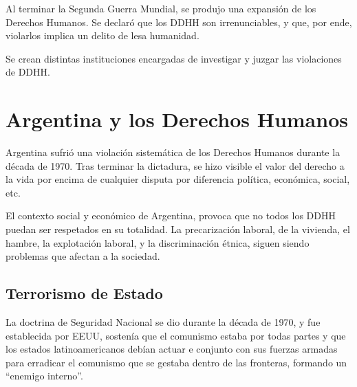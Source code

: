 \documentclass[a4paper, 12pt]{article}
\begin{document}
Al terminar la Segunda Guerra Mundial, se produjo una expansión de los Derechos
Humanos. Se declaró que los DDHH son irrenunciables, y que, por ende, violarlos
implica un delito de lesa humanidad.

Se crean distintas instituciones encargadas de investigar y juzgar las
violaciones de DDHH.

\section{Argentina y los Derechos Humanos}

Argentina sufrió una violación sistemática de los Derechos Humanos durante la
década de 1970. Tras terminar la dictadura, se hizo visible el valor del
derecho a la vida por encima de cualquier disputa por diferencia política,
económica, social, etc.

El contexto social y económico de Argentina, provoca que no todos los DDHH
puedan ser respetados en su totalidad. La precarización laboral, de la
vivienda, el hambre, la explotación laboral, y la discriminación étnica, siguen
siendo problemas que afectan a la sociedad.

\subsection*{Terrorismo de Estado}
La doctrina de Seguridad Nacional se dio durante la década de 1970, y fue
establecida por EEUU, sostenía que el comunismo estaba por todas partes y que
los estados latinoamericanos debían actuar e conjunto con sus fuerzas armadas
para erradicar el comunismo que se gestaba dentro de las fronteras, formando un
``enemigo interno''.
\end{document}
